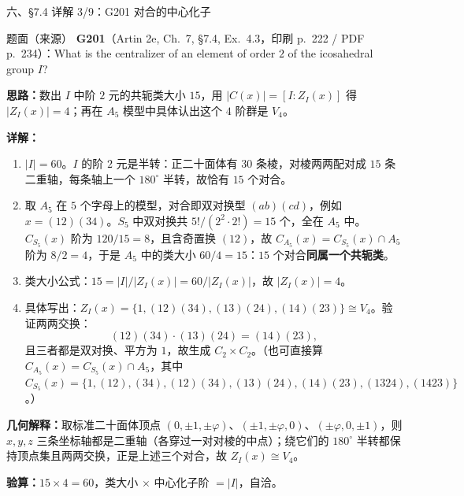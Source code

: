 \documentclass[aspectratio=169,10pt,fontset=none]{ctexbeamer}
\newcommand{\ex}[1]{\textcolor{accent}{\footnotesize\bfseries #1}}
\newcommand{\key}[1]{\textcolor{ink}{\bfseries #1}}
\begin{document}
\begin{frame}[t]{六、\S7.4 详解 3/9：G201 对合的中心化子}
\label{ex:G201}
\scriptsize
\begin{block}{\footnotesize 题面（来源）}
\ex{G201}（Artin 2e, Ch.~7, \S7.4, Ex.~4.3，印刷 p.~222 / PDF p.~234）：What is the centralizer of an element of order $2$ of the icosahedral group $I$?
\end{block}
\key{思路：}数出 $I$ 中阶 $2$ 元的共轭类大小 $15$，用 $|C(x)|=[I:Z_I(x)]$ 得 $|Z_I(x)|=4$；再在 $A_5$ 模型中具体认出这个 $4$ 阶群是 $V_4$。

\key{详解：}
\begin{enumerate}\setlength{\itemsep}{1pt}
\item $|I|=60$。$I$ 的阶 $2$ 元是半转：正二十面体有 $30$ 条棱，对棱两两配对成 $15$ 条二重轴，每条轴上一个 $180^\circ$ 半转，故恰有 $15$ 个对合。
\item 取 $A_5$ 在 $5$ 个字母上的模型，对合即双对换型 $(ab)(cd)$，例如 $x=(12)(34)$。$S_5$ 中双对换共 $5!/(2^2\cdot2!)=15$ 个，全在 $A_5$ 中。$C_{S_5}(x)$ 阶为 $120/15=8$，且含奇置换 $(12)$，故 $C_{A_5}(x)=C_{S_5}(x)\cap A_5$ 阶为 $8/2=4$，于是 $A_5$ 中的类大小 $60/4=15$：$15$ 个对合\textbf{同属一个共轭类}。
\item 类大小公式：$15=|I|/|Z_I(x)|=60/|Z_I(x)|$，故 $|Z_I(x)|=4$。
\item 具体写出：$Z_I(x)=\{1,(12)(34),(13)(24),(14)(23)\}\cong V_4$。验证两两交换：
\[ (12)(34)\cdot(13)(24)=(14)(23), \]
且三者都是双对换、平方为 $1$，故生成 $C_2\times C_2$。（也可直接算 $C_{A_5}(x)=C_{S_5}(x)\cap A_5$，其中 $C_{S_5}(x)=\{1,(12),(34),(12)(34),(13)(24),(14)(23),(1324),(1423)\}$。）
\end{enumerate}
\key{几何解释：}取标准二十面体顶点 $(0,\pm1,\pm\varphi)$、$(\pm1,\pm\varphi,0)$、$(\pm\varphi,0,\pm1)$，则 $x,y,z$ 三条坐标轴都是二重轴（各穿过一对对棱的中点）；绕它们的 $180^\circ$ 半转都保持顶点集且两两交换，正是上述三个对合，故 $Z_I(x)\cong V_4$。

\key{验算：}$15\times4=60$，类大小 $\times$ 中心化子阶 $=|I|$，自洽。
\end{frame}
\end{document}
